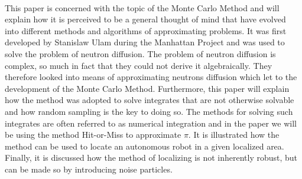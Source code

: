 \documentclass[../SRP.tex]{subfiles}
\begin{document}
\begin{titlepage}
  \begin{center}
  \begin{minipage}{0.8\textwidth}
    \\
    \justify
    This paper is concerned with the topic of the Monte Carlo Method and will explain how it is perceived to be a general thought of mind that have evolved into different methods and algorithms of approximating problems. It was first developed by Stanislaw Ulam during the Manhattan Project and was used to solve the problem of neutron diffusion. The problem of neutron diffusion is complex, so much in fact that they could not derive it algebraically. They therefore looked into means of approximating neutrons diffusion which let to the development of the Monte Carlo Method. Furthermore, this paper will explain how the method was adopted to solve integrates that are not otherwise solvable and how random sampling is the key to doing so. The methods for solving such integrates are often referred to as numerical integration and in the paper we will be using the method Hit-or-Miss to approximate $\pi$. It is illustrated how the method can be used to locate an autonomous robot in a given localized area. Finally, it is discussed how the method of localizing is not inherently robust, but can be made so by introducing noise particles. 
  \end{minipage}
  \end{center}
\end{titlepage}
\end{document}
